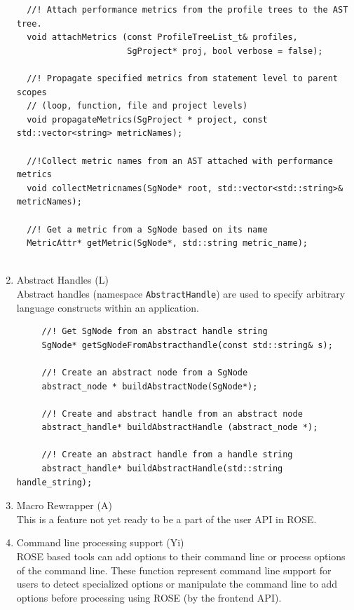\begin{enumerate}
\begin{lstlisting}
  //! Attach performance metrics from the profile trees to the AST tree.
  void attachMetrics (const ProfileTreeList_t& profiles,
                      SgProject* proj, bool verbose = false);

  //! Propagate specified metrics from statement level to parent scopes 
  // (loop, function, file and project levels)
  void propagateMetrics(SgProject * project, const std::vector<string> metricNames);

  //!Collect metric names from an AST attached with performance metrics
  void collectMetricnames(SgNode* root, std::vector<std::string>& metricNames); 

  //! Get a metric from a SgNode based on its name
  MetricAttr* getMetric(SgNode*, std::string metric_name);


\end{lstlisting}

   \item Abstract Handles (L)\\
     Abstract handles (namespace \lstinline{AbstractHandle}) are used to specify arbitrary language constructs within an application.
     \begin{lstlisting}
     //! Get SgNode from an abstract handle string
     SgNode* getSgNodeFromAbstracthandle(const std::string& s);  

     //! Create an abstract node from a SgNode
     abstract_node * buildAbstractNode(SgNode*);

     //! Create and abstract handle from an abstract node
     abstract_handle* buildAbstractHandle (abstract_node *);

     //! Create an abstract handle from a handle string
     abstract_handle* buildAbstractHandle(std::string handle_string);

     \end{lstlisting}

   \item Macro Rewrapper (A) \\
         This is a feature not yet ready to be a part of the user API in ROSE.

   \item Command line processing support (Yi) \\
   ROSE based tools can add options to their command line or process options of the
   command line.  These function represent command line support for users to detect
   specialized options or manipulate the command line to add options before processing
   using ROSE (by the frontend API).


\end{enumerate}
